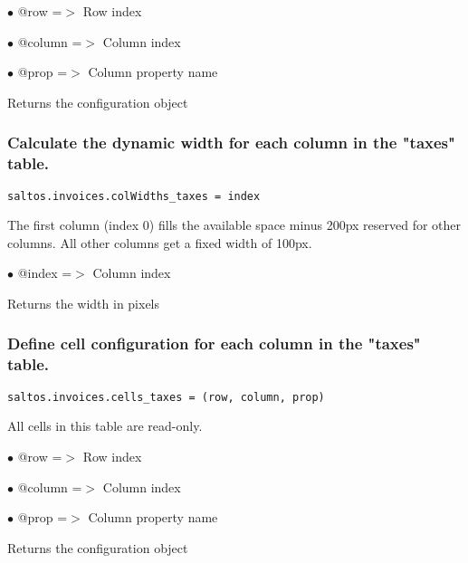 \documentclass[a4paper]{article}
\begin{document}
\begin{compactitem}
\item[\color{myblue}$\bullet$] @row    =$>$ Row index
\item[\color{myblue}$\bullet$] @column =$>$ Column index
\item[\color{myblue}$\bullet$] @prop   =$>$ Column property name
\end{compactitem}

Returns the configuration object

\hypertarget{toc149}{}
\subsubsection{Calculate the dynamic width for each column in the "taxes" table.}

\begin{lstlisting}
saltos.invoices.colWidths_taxes = index
\end{lstlisting}

The first column (index 0) fills the available space minus 200px reserved for other columns.
All other columns get a fixed width of 100px.

\begin{compactitem}
\item[\color{myblue}$\bullet$] @index =$>$ Column index
\end{compactitem}

Returns the width in pixels

\hypertarget{toc150}{}
\subsubsection{Define cell configuration for each column in the "taxes" table.}

\begin{lstlisting}
saltos.invoices.cells_taxes = (row, column, prop)
\end{lstlisting}

All cells in this table are read-only.

\begin{compactitem}
\item[\color{myblue}$\bullet$] @row    =$>$ Row index
\item[\color{myblue}$\bullet$] @column =$>$ Column index
\item[\color{myblue}$\bullet$] @prop   =$>$ Column property name
\end{compactitem}

Returns the configuration object
\end{document}
